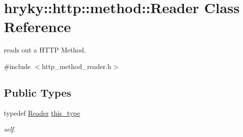 \hypertarget{classhryky_1_1http_1_1method_1_1_reader}{\section{hryky\-:\-:http\-:\-:method\-:\-:Reader Class Reference}
\label{classhryky_1_1http_1_1method_1_1_reader}
}


reads out a H\-T\-T\-P Method.  




{\ttfamily \#include $<$http\-\_\-method\-\_\-reader.\-h$>$}

\subsection*{Public Types}
\begin{DoxyCompactItemize}
\item 
\hypertarget{classhryky_1_1http_1_1method_1_1_reader_acbfb161bac6c8d7c1eacb754150061a1}{typedef \hyperlink{classhryky_1_1http_1_1method_1_1_reader}{Reader} \hyperlink{classhryky_1_1http_1_1method_1_1_reader_acbfb161bac6c8d7c1eacb754150061a1}{this\-\_\-type}}\label{classhryky_1_1http_1_1method_1_1_reader_acbfb161bac6c8d7c1eacb754150061a1}

\begin{DoxyCompactList}\small\item\em self. \end{DoxyCompactList}\end{DoxyCompactItemize}
